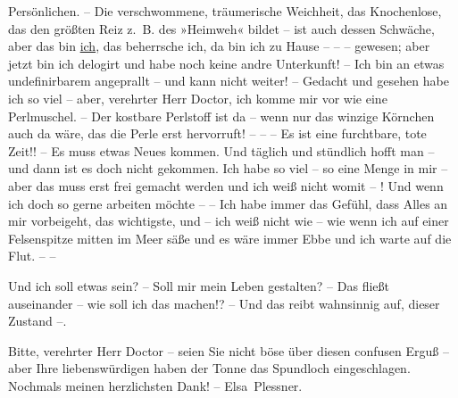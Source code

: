                Persönlichen. – Die verschwommene, träumerische
               Weichheit, das Knochenlose, das den größten Reiz z. B. des »Heimweh« bildet – ist auch dessen Schwäche, aber das bin \uline{ich}, das beherrsche ich, da bin ich zu Hause – – –
               gewesen; aber jetzt bin ich delogirt und habe noch keine andre Unterkunft! – Ich bin
               an etwas undefinirbarem angeprallt – und kann nicht weiter! – Gedacht und gesehen
               habe ich so viel – aber, verehrter Herr Doctor, ich komme mir vor wie eine
               Perlmuschel. – Der kostbare Perlstoff ist da – wenn nur das winzige Körnchen auch da
               wäre, das die Perle erst hervorruft! – – – Es ist eine furchtbare, tote Zeit!! – Es
               muss etwas Neues kommen. Und täglich und stündlich hofft man – und dann ist es doch
               nicht gekommen. Ich habe so viel – so eine Menge in mir – aber das muss erst frei
               gemacht werden und ich weiß nicht womit – ! Und wenn ich doch so gerne arbeiten
               möchte – – Ich habe immer das Gefühl, dass Alles an mir vorbeigeht, das wichtigste,
               und – ich weiß nicht wie – wie wenn ich auf einer Felsenspitze mitten im Meer säße
               und es wäre immer Ebbe und ich warte auf die Flut. – –\pend
           
\pstart
           Und ich soll etwas sein? – Soll mir mein Leben gestalten? – Das fließt auseinander –
               wie soll ich das machen!? – Und das reibt wahnsinnig auf, dieser Zustand –.\pend
           
\pstart
           Bitte, verehrter Herr Doctor – seien Sie nicht böse über diesen confusen Erguß – aber
               Ihre liebenswürdigen \label{K_L03712-1v}\label{K_L03712-1} haben der Tonne
               das Spundloch eingeschlagen. Nochmals meinen herzlichsten Dank! –\pend
           \pstart \spacefill\mbox{Elsa Plessner.}\pend{}\endnumbering{}  \newcommand{\dateiname}{L03712}\newcommand{\titel}{Elsa Plessner an Arthur Schnitzler, 13. 1. 1897}\newcommand{\editorInnen}{Selma Jahnke und Martin Anton Müller}
